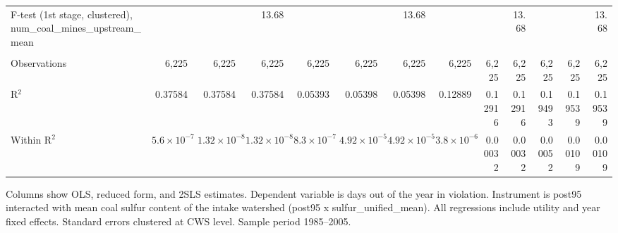 \begin{table}[htbp]
\begin{adjustbox}{width = \textwidth, center}
\begin{tabular}{lrrrrrrrrrrrr}
         F-test (1st stage, clustered), num\_coal\_mines\_upstream\_mean     &                      &                       & 13.68                 &                      &                       & 13.68                 &                      &          & 13.68    &          &          & 13.68\\  
         
          \\
         
         Observations                                                        & 6,225                & 6,225                 & 6,225                 & 6,225                & 6,225                 & 6,225                 & 6,225                & 6,225    & 6,225    & 6,225    & 6,225    & 6,225\\  
         R$^2$                                                               & 0.37584              & 0.37584               & 0.37584               & 0.05393              & 0.05398               & 0.05398               & 0.12889              & 0.12916  & 0.12916  & 0.19493  & 0.19539  & 0.19539\\  
         Within R$^2$                                                        & $5.6\times 10^{-7}$  & $1.32\times 10^{-8}$  & $1.32\times 10^{-8}$  & $8.3\times 10^{-7}$  & $4.92\times 10^{-5}$  & $4.92\times 10^{-5}$  & $3.8\times 10^{-6}$  & 0.00032  & 0.00032  & 0.00052  & 0.00109  & 0.00109\\  
         
         \bottomrule
         
      \end{tabular}
      
      
      
   \end{adjustbox}
      {\tiny\linespread{1}\selectfont \par \raggedright 
   Columns show OLS, reduced form, and 2SLS estimates. Dependent variable is days out of the year in violation. Instrument is post95 interacted with mean coal sulfur content of the intake watershed (post95 x sulfur\_unified\_mean). All regressions include utility and year fixed effects. Standard errors clustered at CWS level. Sample period 1985--2005.}
   
\end{table}


